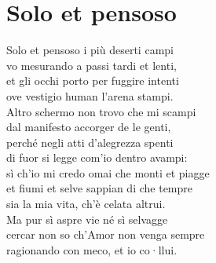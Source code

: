 \documentclass[10pt,a4paper]{article}
\begin{document}
\section{Solo et pensoso}
\label{sec:Solo et pensoso}

\begin{estratto}
	Solo et pensoso i più deserti campi\\
	vo mesurando a passi tardi et lenti,\\
	et gli occhi porto per fuggire intenti\\
	ove vestigio human l’arena stampi.\\
	
	Altro schermo non trovo che mi scampi\\
	dal manifesto accorger de le genti,\\
	perché negli atti d’alegrezza spenti\\
	di fuor si legge com’io dentro avampi:\\
	
	sì ch’io mi credo omai che monti et piagge\\
	et fiumi et selve sappian di che tempre\\
	sia la mia vita, ch’è celata altrui.\\
	
	Ma pur sì aspre vie né sì selvagge\\
	cercar non so ch’Amor non venga sempre\\
	ragionando con meco, et io co·llui.\\
\end{estratto}
\end{document}
